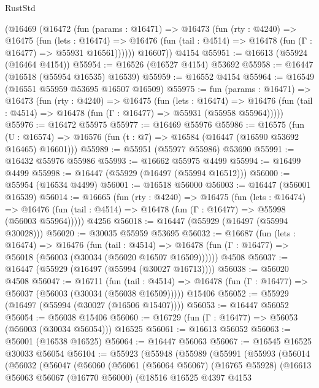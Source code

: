 \begin{lexlean}{RustStd}
\begin{coremodule}
{\begin{coremodule}
{{{{{{{{{{{{{{{{{{{{{{{{{{{{{{{{{{{{{{{{{{{{{{{{{{{{{{{      (@16469
        (@16472
          (fun (params : @16471) =>
          @16473
            (fun (rty : @4240) =>
            @16475
              (fun (lets : @16474) =>
              @16476 (fun (tail : @4514) => @16478 (fun (Γ : @16477) => @55931 @16561))))))
        @16607))
    @4154
@55951 := @16613 (@55924 (@16464 @4154))
@55954 := @16526 (@16527 @4154) @53692
@55958 := @16447 (@16518 (@55954 @16535) @16539)
@55959 := @16552 @4154
@55964 := @16549 (@16551 @55959 @53695 @16507 @16509)
@55975 := fun (params : @16471) =>
  @16473
    (fun (rty : @4240) =>
    @16475
      (fun (lets : @16474) =>
      @16476 (fun (tail : @4514) => @16478 (fun (Γ : @16477) => @55931 (@55958 @55964)))))
@55976 := @16472 @55975
@55977 := @16469 @55976
@55986 := @16575
    (fun (U : @16574) => @16576 (fun (t : @7) => @16584 (@16447 (@16590 @53692 @16465) @16601)))
@55989 := @55951 (@55977 @55986) @53690
@55991 := @16432 @55976 @55986
@55993 := @16662 @55975 @4499
@55994 := @16499 @4499
@55998 := @16447 (@55929 (@16497 (@55994 @16512)))
@56000 := @55954 (@16534 @4499)
@56001 := @16518 @56000
@56003 := @16447 (@56001 @16539)
@56014 := @16665
    (fun (rty : @4240) =>
    @16475
      (fun (lets : @16474) =>
      @16476 (fun (tail : @4514) => @16478 (fun (Γ : @16477) => @55998 (@56003 @55964)))))
    @4256
@56018 := @16447 (@55929 (@16497 (@55994 @30028)))
@56020 := @30035 @55959 @53695
@56032 := @16687
    (fun (lets : @16474) =>
    @16476
      (fun (tail : @4514) =>
      @16478 (fun (Γ : @16477) => @56018 (@56003 (@30034 (@56020 @16507 @16509))))))
    @4508
@56037 := @16447 (@55929 (@16497 (@55994 (@30027 @16713))))
@56038 := @56020 @4508
@56047 := @16711
    (fun (tail : @4514) => @16478 (fun (Γ : @16477) => @56037 (@56003 (@30034 (@56038 @16509)))))
    @15406
@56052 := @55929 (@16497 (@55994 (@30027 (@16506 @15407))))
@56053 := @16447 @56052
@56054 := @56038 @15406
@56060 := @16729 (fun (Γ : @16477) => @56053 (@56003 (@30034 @56054))) @16525
@56061 := @16613 @56052
@56063 := @56001 (@16538 @16525)
@56064 := @16447 @56063
@56067 := @16545 @16525 @30033 @56054
@56104 := @55923
    (@55948
      (@55989
        (@55991
          (@55993
            (@56014
              (@56032
                (@56047
                  (@56060
                    (@56061
                      (@56064 @56067)
                      (@16765 @55928)
                      (@16613
                        @56063
                        @56067
                        (@16770 @56000)
                        (@18516
                          @16525
                          @4397
                          @4153
}}}}}}}}}}}}}}}}}}}}}}}}}}}}}}}}}}}}}}}}}}}}}}}}}}}}}}}
\end{coremodule}}
\end{coremodule}
\end{lexlean}
